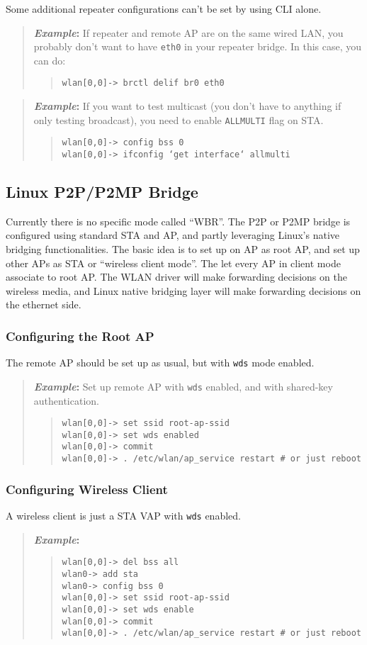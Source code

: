 \documentclass[10pt,fullpage]{article}
\newcommand{\mytt}[1]{{\texttt{#1}}}
\newcommand{\bv}{\begin{verse}}
\newcommand{\ev}{\end{verse}}
\newcommand{\cliparam}[1]{{\texttt{#1}}}
\newcommand{\clidemo}[1]{{\texttt{wlan[0,0]-> #1}}}
\newcommand{\clidemonobss}[1]{{\texttt{wlan0-> #1}}}
\newenvironment{example}{\begin{quote}\textbf{\textit{Example}:}}{\end{quote}}
\begin{document}
Some additional repeater configurations can't be set by using CLI alone. 

\begin{example}
If repeater and remote AP are on the same wired LAN,
you probably don't want to have \mytt{eth0} in your repeater bridge.
In this case, you can do:
  \bv
  \clidemo{brctl delif br0 eth0}
  \ev
\end{example}

\begin{example}
If you want to test multicast (you don't have to anything if only
testing broadcast), you need to enable \mytt{ALLMULTI} flag on STA.
  \bv
  \clidemo{config bss 0}\\
  \clidemo{ifconfig `get interface` allmulti}
  \ev
\end{example}

\subsection{Linux P2P/P2MP Bridge}
Currently there is no specific mode called ``WBR''. The P2P or P2MP bridge
is configured using standard STA and AP, and partly leveraging Linux's
native bridging functionalities. The basic idea is to set up on AP as root
AP, and set up other APs as STA or ``wireless client mode''. The let every
AP in client mode associate to root AP. The WLAN driver will make forwarding
decisions on the wireless media, and Linux native bridging layer will
make forwarding decisions on the ethernet side.

\subsubsection{Configuring the Root AP}
The remote AP should be set up as usual, but with \cliparam{wds} mode
enabled.
\begin{example}
  Set up remote AP with \cliparam{wds} enabled, and with shared-key
authentication.
  \bv
  \clidemo{set ssid root-ap-ssid}\\
  \clidemo{set wds enabled}\\
  \clidemo{commit}\\
  \clidemo{.  /etc/wlan/ap\_service restart        \# or just reboot}
  \ev
\end{example}

\subsubsection{Configuring Wireless Client}
A wireless client is just a STA VAP with \cliparam{wds} enabled.
\begin{example}
  \bv
  \clidemo{del bss all}\\
  \clidemonobss{add sta}\\
  \clidemonobss{config bss 0}\\
  \clidemo{set ssid root-ap-ssid}\\
  \clidemo{set wds enable}\\
  \clidemo{commit}\\
  \clidemo{.  /etc/wlan/ap\_service restart        \# or just reboot}
  \ev
\end{example}
\end{document}
